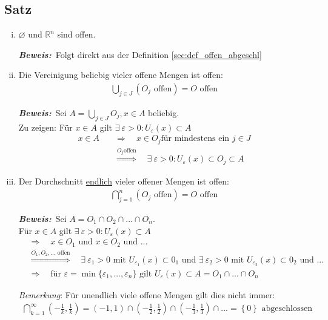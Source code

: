 \documentclass[11pt,a4paper]{book}
\newcommand {\Rn}	{\mathbb{R}^n}
\newcommand{\1}    	{\mathbbm{1}}
\newcommand{\mitt}	{\textrm{ mit }}
\newcommand{\Beweis}[1][Beweis]
{\begin{mdframed}[backgroundcolor=gray!10,linewidth=0pt]\noindent\textit{\textbf{{#1}:}}~}
\newcommand{\QED}	{\end{mdframed}}
\begin{document}
\subsection{Satz}
\begin{enumerate}[(i)]
	\item \(\varnothing\) und \(\Rn\) sind offen.
	\Beweis Folgt direkt aus der Definition \ref{sec:def_offen_abgeschl} \QED
	\item Die Vereinigung beliebig vieler offene Mengen ist offen:
	\begin{align*}
		\bigcup_{j \in J} \left( O_j \textrm{ offen} \right) = O \textrm{ offen}
	\end{align*}
	\Beweis Sei \(A = \bigcup_{j \in J} O_j, x \in A\) beliebig.\\
	Zu zeigen: Für \(x \in A\) gilt \(\exists~ \varepsilon > 0 : U_\varepsilon(x) \subset A\)
	\begin{align*}
		x \in A \quad&\Rightarrow\quad x \in O_j \textrm{für mindestens ein } j \in J \\
		&\stackrel{O_j \textrm{offen}}{\Rightarrow}\quad \exists~ \varepsilon > 0 : U_\varepsilon(x) \subset O_j \subset A
	\end{align*}
	\QED
	\item Der Durchschnitt \underline{endlich} vieler offener Mengen ist offen:
	\begin{align*}
		\bigcap_{j = 1}^{n} \left( O_j \textrm{ offen} \right) = O \textrm{ offen}
	\end{align*}
	\Beweis Sei \(A = O_1 \cap O_2 \cap ... \cap O_n\).\\
	Für \(x \in A\) gilt \(\exists~ \varepsilon > 0 : U_\varepsilon(x) \subset A\)
	\begin{align*}
		&\Rightarrow\quad x \in O_1 \textrm{ und } x \in O_2 \textrm{ und } ... \\
		&\stackrel{O_1, O_2, ... \textrm{ offen}}{\Rightarrow}\quad \exists~ \varepsilon_1 > 0 \mitt U_{\varepsilon_1}(x) \subset 0_1 \textrm{ und }
		\exists~ \varepsilon_2 > 0 \mitt U_{\varepsilon_2}(x) \subset 0_2 \textrm{ und } ... \\
		&\Rightarrow\quad \textrm{für } \varepsilon = \min\{ \varepsilon_1, ..., \varepsilon_n \} \textrm{ gilt } U_\varepsilon(x) \subset A = O_1 \cap ... \cap O_n
	\end{align*}
	\QED
	\textit{Bemerkung}: Für unendlich viele offene Mengen gilt dies nicht immer:
	\begin{align*}
		\bigcap_{k = 1}^{\infty} \left( -\frac{1}{k}, \frac{1}{k} \right) = \left( -1, 1 \right) \cap \left( -\frac{1}{2}, \frac{1}{2} \right) \cap \left( -\frac{1}{3}, \frac{1}{3} \right) \cap ... = \left\{ 0 \right\} \textrm{ abgeschlossen}
	\end{align*}
\end{enumerate}
\end{document}
